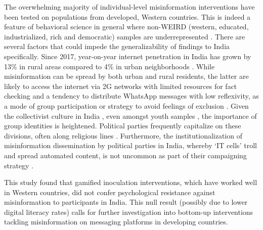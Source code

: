 \documentclass[empirical, authordate]{jote-new-article}
\begin{document}
The overwhelming majority of individual-level misinformation interventions have been tested on populations from developed, Western countries. This is indeed a feature of behavioral science in general where non-WEIRD (western, educated, industrialized, rich and democratic) samples are underrepresented \parencite{Henrich2010, Rad2018}. There are several factors that could impede the generalizability of findings to India specifically. Since 2017, year-on-year internet penetration in India has grown by 13\% in rural areas compared to 4\% in urban neighborhoods \parencite{Bhattacharjee2021}. While misinformation can be spread by both urban and rural residents, the latter are likely to access the internet via 2G networks with limited resources for fact checking and a tendency to distribute \mbox{WhatsApp} messages with low reflexivity, as a mode of group participation or strategy to avoid feelings of exclusion \parencite{Banaji2019}. Given the collectivist culture in India \parencite{Kapoor2003, Verma2020}, even amongst youth samples \parencite{Rao2013}, the importance of group identities is heightened. Political parties frequently capitalize on these divisions, often along religious lines \parencite{Vaishnav2019}. Furthermore, the institutionalization of misinformation dissemination by political parties in India, whereby ‘IT cells' troll and spread automated content, is not uncommon \parencite{Campbell-Smith2019} as part of their campaigning strategy \parencite{Banaji2019}.

\begin{takeHomeMessage}

  This study found that gamified inoculation interventions, which have worked well in Western countries, did not confer psychological resistance against misinformation to participants in India. This null result (possibly due to lower digital literacy rates) calls for further investigation into bottom-up interventions tackling misinformation on messaging platforms in developing countries.
\end{takeHomeMessage}
\end{document}
